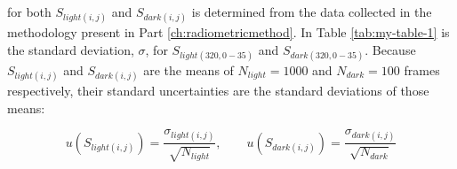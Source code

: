 \documentclass[nohyper,nobib]{tufte-book}
\begin{document}
 for both $S_{light(i,j)}$ and $S_{dark(i,j)}$ is determined from the data collected in the methodology present in  Part \ref{ch:radiometricmethod}. In Table \ref{tab:my-table-1} is the standard deviation, $\sigma$, for  $S_{light(320, 0-35)}$ and $S_{dark(320, 0-35)}$. Because $S_{light(i,j)}$ and $S_{dark(i,j)}$ are the means of $N_{light} = 1000$ and $N_{dark} = 100$ frames respectively, their standard uncertainties are the standard deviations of those means:

\begin{equation}
	u\left(S_{light(i,j)}\right) = \frac{\sigma_{light(i,j)}}{\sqrt{N_{light}}}, \qquad u\left(S_{dark(i,j)}\right) = \frac{\sigma_{dark(i,j)}}{\sqrt{N_{dark}}}
\end{equation}

\end{document}
